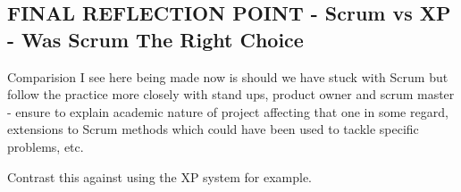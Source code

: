 \documentclass{l3proj}
\begin{document}
\subsection{FINAL REFLECTION POINT - Scrum vs XP - Was Scrum The Right Choice}
\label{sec:scrumvsxp}

Comparision I see here being made now is should we have stuck with Scrum but follow the practice more closely with stand ups, product owner and scrum master - ensure to explain academic nature of project affecting that one in some regard, extensions to Scrum methods which could have been used to tackle specific problems, etc.

Contrast this against using the XP system for example.
\end{document}
